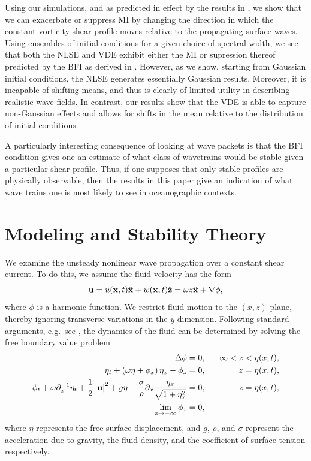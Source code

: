 \documentclass[a4paper,11pt]{article}
\newcommand{\pd}{\partial}
\begin{document}
Using our simulations, and as predicted in effect by the results in \cite{curtis8}, we show that we can exacerbate or suppress MI by changing the direction in which the constant vorticity shear profile moves relative to the propagating surface waves.  Using ensembles of initial conditions for a given choice of spectral width, we see that both the NLSE and VDE exhibit either the MI or supression thereof predicted by the BFI as derived in \cite{alber}.  However, as we show, starting from Gaussian initial conditions, the NLSE generates essentially Gaussian results.  Moreover, it is incapable of shifting means, and thus is clearly of limited utility in describing realistic wave fields.  In contrast, our results show that the VDE is able to capture non-Gaussian effects and allows for shifts in the mean relative to the distribution of initial conditions.  

A particularly interesting consequence of looking at wave packets is that the BFI condition gives one an estimate of what class of wavetrains would be stable given a particular shear profile.  Thus, if one supposes that only stable profiles are physically observable, then the results in this paper give an indication of what wave trains one is most likely to see in oceanographic contexts.  

\section*{Modeling and Stability Theory}
We examine the unsteady nonlinear wave propagation over a constant shear current.  To do this, we assume the fluid velocity has the form
\[
{\bf u} = u({\bf x},t)\hat{{\bf x}} + w({\bf x},t)\hat{{\bf z}} = \omega z\hat{{\bf x}} + \nabla \phi,
\]
where $\phi$ is a harmonic function.  We restrict fluid motion to the $(x,z)$-plane, thereby ignoring transverse variations in the $y$ dimension.   Following standard arguments, e.g.~see \cite{ashton}, the dynamics of the fluid can be determined by solving the free boundary value problem
\begin{align}
\Delta \phi = 0, & & -\infty< z < \eta(x,t), \nonumber \\
\eta_{t} +\left(\omega\eta+\phi_{x}\right)\eta_{x} - \phi_{z} = 0, & & z=\eta(x,t), \label{kine}\\
\phi_{t} + \omega\pd_{x}^{-1}\eta_{t} + \frac{1}{2} \left|{\bf
    u}\right|^{2} + g\eta -
\frac{\sigma}{\rho}\pd_{x}\frac{\eta_{x}}{\sqrt{1+\eta_{x}^{2}}}= 0, &
& z=\eta(x,t), \label{bernou}\\
\lim_{z\rightarrow -\infty} \phi_{z} = 0, \nonumber
\end{align}
where $\eta$ represents the free surface displacement, and $g$, $\rho$, and $\sigma$ represent the acceleration due to gravity, the fluid density, and the coefficient of surface tension respectively.
\end{document}
